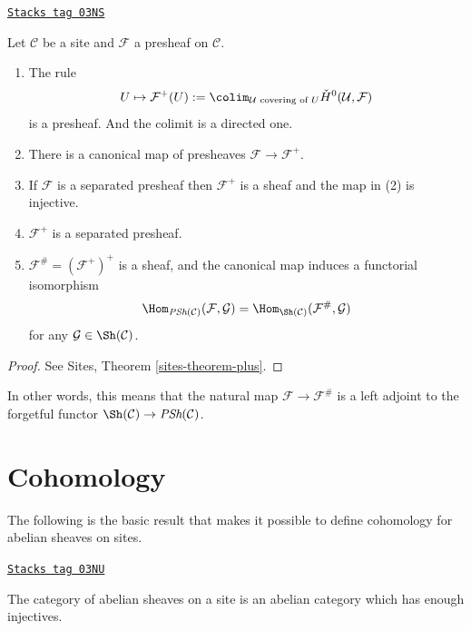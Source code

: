 \begin{theorem}[Sheafification]
\label{etale-cohomology-theorem-sheafification}
\href{https://stacks.math.columbia.edu/tag/03NS}{\texttt{Stacks tag 03NS}}

Let $\mathcal{C}$ be a site and $\mathcal{F}$ a presheaf on $\mathcal{C}$.
\begin{enumerate}
\item The rule
$$
U \mapsto \mathcal{F}^+(U) :=
\colim_{\mathcal{U} \text{ covering of }U}
\check H^0(\mathcal{U}, \mathcal{F})
$$
is a presheaf. And the colimit is a directed one.
\item There is a canonical map of presheaves $\mathcal{F} \to \mathcal{F}^+$.
\item If $\mathcal{F}$ is a separated presheaf then $\mathcal{F}^+$ is a sheaf
and the map in (2) is injective.
\item $\mathcal{F}^+$ is a separated presheaf.
\item $\mathcal{F}^\# = (\mathcal{F}^+)^+$ is a sheaf, and the canonical
map induces a functorial isomorphism
$$
\Hom_{\textit{PSh}(\mathcal{C})}(\mathcal{F}, \mathcal{G}) =
\Hom_{\Sh(\mathcal{C})}(\mathcal{F}^\#, \mathcal{G})
$$
for any $\mathcal{G} \in \Sh(\mathcal{C})$.
\end{enumerate}
\end{theorem}

\begin{proof}
See Sites, Theorem \ref{sites-theorem-plus}.
\end{proof}

In other words, this means that the natural map
$\mathcal{F} \to \mathcal{F}^\#$ is a left adjoint to the forgetful functor
$\Sh(\mathcal{C}) \to \textit{PSh}(\mathcal{C})$.

\section{Cohomology}
\label{etale-cohomology-section-cohomology}
The following is the basic result that makes it possible to define cohomology
for abelian sheaves on sites.

\begin{theorem}
\label{etale-cohomology-theorem-enough-injectives}
\href{https://stacks.math.columbia.edu/tag/03NU}{\texttt{Stacks tag 03NU}}

The category of abelian sheaves on a site is an abelian category
which has enough injectives.
\end{theorem}


